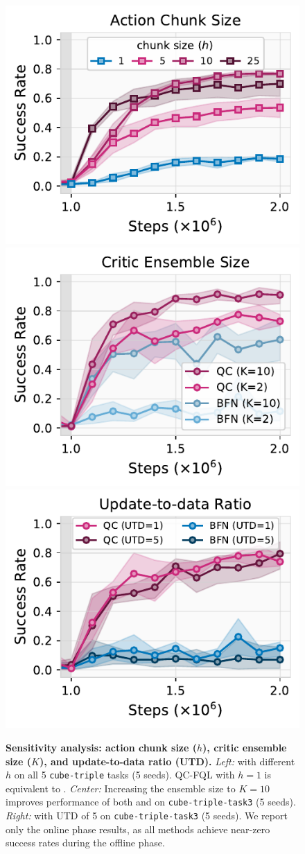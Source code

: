 \begin{figure}[t]
    \includegraphics[width=0.33\linewidth]{figures/ac-size.pdf}
    \includegraphics[width=0.33\linewidth]{figures/10qs.pdf}
    \includegraphics[width=0.33\linewidth]{figures/utd.pdf}
    \caption{\footnotesize \textbf{Sensitivity analysis: action chunk size ($h$), critic ensemble size ($K$), and update-to-data ratio (UTD).} \emph{Left:}  with different $h$ on all 5 \texttt{cube-triple} tasks (5 seeds). QC-FQL with $h=1$ is equivalent to . \emph{Center:} Increasing the ensemble size to $K=10$ improves performance of both  and  on \texttt{cube-triple-task3} (5 seeds). \emph{Right:}  with UTD of 5 on \texttt{cube-triple-task3} (5 seeds). We report only the online phase results, as all methods achieve near-zero success rates during the offline phase.}
    \label{fig:sensitivity}
\end{figure}
